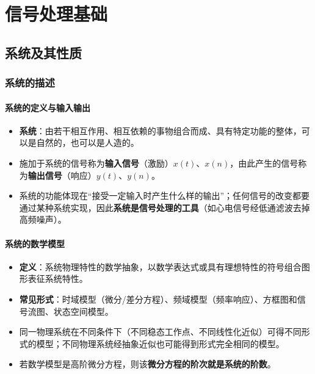 
\chapter{信号处理基础}

\section{系统及其性质}

\subsection{系统的描述}

\subsubsection{系统的定义与输入输出}
\begin{itemize}
\item \textbf{系统}：由若干相互作用、相互依赖的事物组合而成、具有特定功能的整体，可以是自然的，也可以是人造的。
\item 施加于系统的信号称为\textbf{输入信号}（激励）$x(t)$、$x(n)$，由此产生的信号称为\textbf{输出信号}（响应）$y(t)$、$y(n)$。
\item 系统的功能体现在“接受一定输入时产生什么样的输出”；任何信号的改变都要通过某种系统实现，因此\textbf{系统是信号处理的工具}（如心电信号经低通滤波去掉高频噪声）。
\end{itemize}

\subsubsection{系统的数学模型}
\begin{itemize}
\item \textbf{定义}：系统物理特性的数学抽象，以数学表达式或具有理想特性的符号组合图形表征系统特性。
\item \textbf{常见形式}：时域模型（微分/差分方程）、频域模型（频率响应）、方框图和信号流图、状态空间模型。
\item 同一物理系统在不同条件下（不同稳态工作点、不同线性化近似）可得不同形式的模型；不同物理系统经抽象近似也可能得到形式完全相同的模型。
\item 若数学模型是高阶微分方程，则该\textbf{微分方程的阶次就是系统的阶数}。
\end{itemize}

